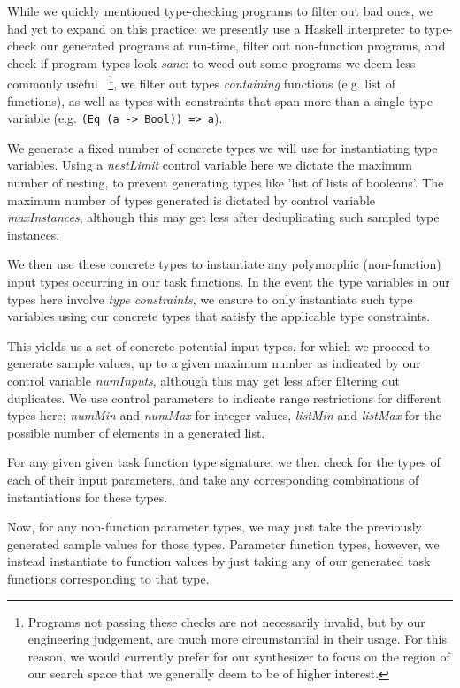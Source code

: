 \documentclass{article}
\begin{document}
While we quickly mentioned type-checking programs to filter out bad ones,
we had yet to expand on this practice:
we presently use a Haskell interpreter to type-check our generated programs at run-time,
filter out non-function programs,
and check if program types look \emph{sane}:
to weed out some programs we deem less commonly useful%
~\footnote{
    Programs not passing these checks are not necessarily invalid,
    but by our engineering judgement,
    are much more circumstantial in their usage.
    For this reason, we would currently prefer for our synthesizer to focus on
    the region of our search space that we generally deem to be of higher interest.
},
we filter out types \emph{containing} functions (e.g. list of functions),
as well as types with constraints that span more than a single type variable (e.g. \verb|(Eq (a -> Bool)) => a|).

We generate a fixed number of concrete types we will use for instantiating type variables.
Using a \emph{nestLimit} control variable here we dictate the maximum number of nesting,
to prevent generating types like 'list of lists of booleans'.
The maximum number of types generated is dictated by control variable \emph{maxInstances},
although this may get less after deduplicating such sampled type instances.

We then use these concrete types to instantiate any polymorphic
(non-function) input types occurring in our task functions.
In the event the type variables in our types here involve \emph{type constraints},
we ensure to only instantiate such type variables using our concrete types that satisfy the applicable type constraints.

This yields us a set of concrete potential input types,
for which we proceed to generate sample values,
up to a given maximum number as indicated by our control variable \emph{numInputs},
although this may get less after filtering out duplicates.
We use control parameters to indicate range restrictions for different types here;
\emph{numMin} and \emph{numMax} for integer values,
\emph{listMin} and \emph{listMax} for the possible number of elements in a generated list.

For any given given task function type signature,
we then check for the types of each of their input parameters,
and take any corresponding combinations of instantiations for these types.

Now, for any non-function parameter types,
we may just take the previously generated sample values for those types.
Parameter function types, however,
we instead instantiate to function values by just taking
any of our generated task functions corresponding to that type.
\end{document}
